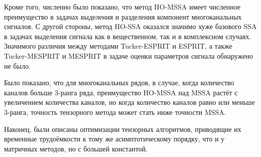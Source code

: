 \documentclass[specialist,
  substylefile = spbu.rtx,
subf,href,colorlinks=true, 12pt]{disser}
\theoremstyle{plain}
\theoremstyle{definition}
\theoremstyle{remark}
\def\tesprit/{Tucker-ESPRIT}
\def\tmesprit/{Tucker-MESPRIT}
\begin{document}
Кроме того, численно было показано, что метод HO-MSSA имеет численное
преимущество в задачах выделения и разделения компонент
многоканальных сигналов.
С другой стороны, метод HO-SSA оказался значимо хуже базового SSA в
задачах выделения сигнала как в вещественном, так и в комплексном случаях.
Значимого различия между методами \tesprit/ и ESPRIT, а также
\tmesprit/ и MESPRIT в задаче оценки параметров сигнала обнаружено не было.

Было показано, что для многоканальных рядов, в случае,
когда количество каналов больше 3-ранга ряда, преимущество HO-MSSA над MSSA
растёт с увеличением количества каналов, но когда количество каналов
равно или меньше 3-ранга, точность тензорного метода может стать ниже
точности MSSA.

Наконец, были описаны оптимизации тензорных алгоритмов, приводящие их
временные трудоёмкости к тому же асимптотическому порядку, что и у
матричных методов, но с большей константой.



\end{document}
